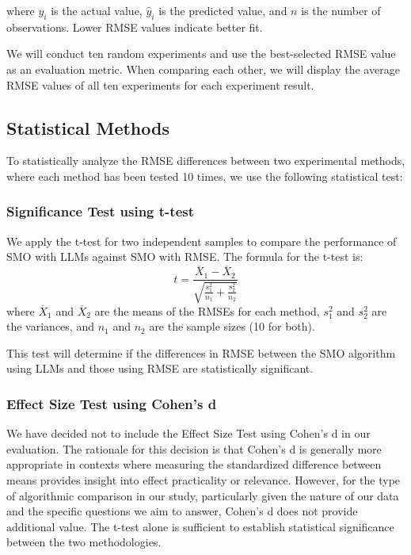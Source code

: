 \documentclass{ieeeaccess}
\begin{document}
where $y_i$ is the actual value, $\hat{y}_i$ is the predicted value, and $n$ is the number of observations. Lower RMSE values indicate better fit.

We will conduct ten random experiments and use the best-selected RMSE value as an evaluation metric. When comparing each other, we will display the average RMSE values of all ten experiments for each experiment result. 


\subsection{Statistical Methods}
To statistically analyze the RMSE differences between two experimental methods, where each method has been tested 10 times, we use the following statistical test:



\subsubsection{Significance Test using t-test}
We apply the t-test for two independent samples to compare the performance of SMO with LLMs against SMO with RMSE. The formula for the t-test is:
\begin{equation}
t = \frac{\overline{X}_1 - \overline{X}_2}{\sqrt{\frac{s_1^2}{n_1} + \frac{s_2^2}{n_2}}}
\end{equation}
where $\overline{X}_1$ and $\overline{X}_2$ are the means of the RMSEs for each method, $s_1^2$ and $s_2^2$ are the variances, and $n_1$ and $n_2$ are the sample sizes (10 for both).

This test will determine if the differences in RMSE between the SMO algorithm using LLMs and those using RMSE are statistically significant.

\subsubsection{Effect Size Test using Cohen's d }
We have decided not to include the Effect Size Test using Cohen's d in our evaluation. The rationale for this decision is that Cohen's d is generally more appropriate in contexts where measuring the standardized difference between means provides insight into effect practicality or relevance. However, for the type of algorithmic comparison in our study, particularly given the nature of our data and the specific questions we aim to answer, Cohen's d does not provide additional value. The t-test alone is sufficient to establish statistical significance between the two methodologies.
\end{document}

